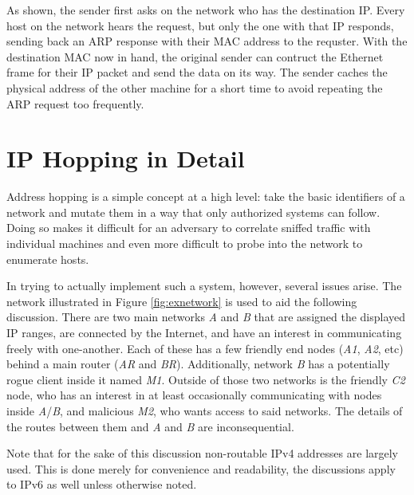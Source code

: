 \par As shown, the sender first asks on the network who has the destination \ac{IP}. Every host on the network hears the request, but only the one with that \ac{IP} responds, sending back an \ac{ARP} response with their \ac{MAC} address to the requster. With the destination \ac{MAC} now in hand, the original sender can contruct the Ethernet frame for their \ac{IP} packet and send the data on its way. The sender caches the physical address of the other machine for a short time to avoid repeating the \ac{ARP} request too frequently.

\section{IP Hopping in Detail}
\label{sec:hopping}
\par Address hopping is a simple concept at a high level: take the basic identifiers of a network and mutate them in a way that only authorized systems can follow. Doing so makes it difficult for an adversary to correlate sniffed traffic with individual machines and even more difficult to probe into the network to enumerate hosts.

\par {}

\par In trying to actually implement such a system, however, several issues arise.  The network illustrated in Figure \ref{fig:exnetwork} is used to aid the following discussion. There are two main networks \textit{A} and \textit{B} that are assigned the displayed IP ranges, are connected by the Internet, and have an interest in communicating freely with one-another. Each of these has a few friendly end nodes (\textit{A1}, \textit{A2}, etc) behind a main router (\textit{AR} and \textit{BR}). Additionally, network \textit{B} has a potentially rogue client inside it named \textit{M1}. Outside of those two networks is the friendly \textit{C2} node, who has an interest in at least occasionally communicating with nodes inside \textit{A}/\textit{B}, and malicious \textit{M2}, who wants access to said networks. The details of the routes between them and \textit{A} and \textit{B} are inconsequential.

\par Note that for the sake of this discussion non-routable \ac{IPv4} addresses are largely used. This is done merely for convenience and readability, the discussions apply to \ac{IPv6} as well unless otherwise noted.

